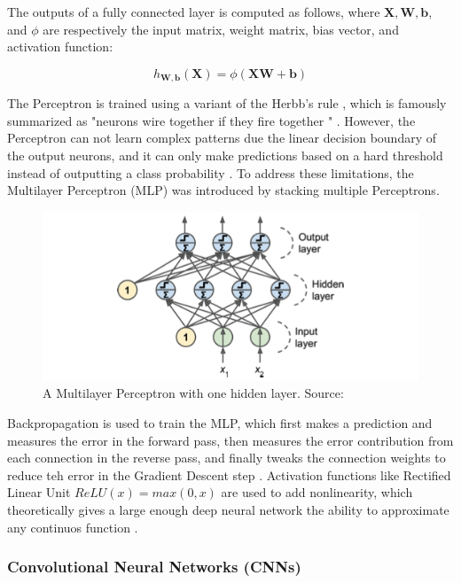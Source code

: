 \documentclass[a4paper,11pt,oneside]{article}
\begin{document}
  The outputs of a fully connected layer is computed as follows, where $\mathbf{X}, \mathbf{W}, \mathbf{b}$, and $\phi$
  are respectively the input matrix, weight matrix, bias vector, and activation function:

  $$h_{\mathbf{W,b}}(\mathbf{X}) = \phi(\mathbf{XW} + \mathbf{b})$$

  The Perceptron is trained using a variant of the Herbb's rule \cite{hebb2005organization}, which is famously summarized
  as "neurons wire together if they fire together \cite{lowel1992selection}" \cite{geron2019hands}. However, the Perceptron
  can not learn complex patterns due the linear decision boundary of the output neurons, and it can only make predictions
  based on a hard threshold instead of outputting a class probability \cite{geron2019hands}. To address these limitations,
  the Multilayer Perceptron (MLP) was introduced by stacking multiple Perceptrons.

  \begin{figure}[ht]
    \begin{center}
      \includegraphics[width=.8\textwidth]{mlp.png}
    \end{center}
    \caption{A Multilayer Perceptron with one hidden layer. Source: \cite{geron2019hands}}
  \end{figure}

  Backpropagation \cite{rumelhart1985learning} is used to train the MLP, which first makes a prediction and measures the
  error in the forward pass, then measures the error contribution from each connection in the reverse pass, and finally
  tweaks the connection weights to reduce teh error in the Gradient Descent \cite{ruder2016overview} step
  \cite{geron2019hands}. Activation functions like Rectified Linear Unit $ReLU(x) = max(0, x)$ are used to add
  nonlinearity, which theoretically gives a large enough deep neural network the ability to approximate any continuos
  function \cite{geron2019hands}.

  \subsubsection{Convolutional Neural Networks (CNNs)}
\end{document}
